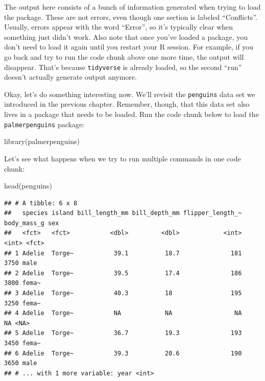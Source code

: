 \documentclass[
]{book}
\newenvironment{Shaded}{\begin{snugshade}}{\end{snugshade}}
\newcommand{\FunctionTok}[1]{\textcolor[rgb]{0.00,0.00,0.00}{#1}}
\newcommand{\NormalTok}[1]{#1}
\begin{document}
The output here consists of a bunch of information generated when trying to load the package. These are not errors, even though one section is labeled ``Conflicts''. Usually, errors appear with the word ``Error'', so it's typically clear when something just didn't work. Also note that once you've loaded a package, you don't need to load it again until you restart your R session. For example, if you go back and try to run the code chunk above one more time, the output will disappear. That's because \texttt{tidyverse} is already loaded, so the second ``run'' doesn't actually generate output anymore.

Okay, let's do something interesting now. We'll revisit the \texttt{penguins} data set we introduced in the previous chapter. Remember, though, that this data set also lives in a package that needs to be loaded. Run the code chunk below to load the \texttt{palmerpenguins} package:

\begin{Shaded}
\begin{Highlighting}[]
\FunctionTok{library}\NormalTok{(palmerpenguins)}
\end{Highlighting}
\end{Shaded}

Let's see what happens when we try to run multiple commands in one code chunk:

\begin{Shaded}
\begin{Highlighting}[]
\FunctionTok{head}\NormalTok{(penguins)}
\end{Highlighting}
\end{Shaded}

\begin{verbatim}
## # A tibble: 6 x 8
##   species island bill_length_mm bill_depth_mm flipper_length_~ body_mass_g sex  
##   <fct>   <fct>           <dbl>         <dbl>            <int>       <int> <fct>
## 1 Adelie  Torge~           39.1          18.7              181        3750 male 
## 2 Adelie  Torge~           39.5          17.4              186        3800 fema~
## 3 Adelie  Torge~           40.3          18                195        3250 fema~
## 4 Adelie  Torge~           NA            NA                 NA          NA <NA> 
## 5 Adelie  Torge~           36.7          19.3              193        3450 fema~
## 6 Adelie  Torge~           39.3          20.6              190        3650 male 
## # ... with 1 more variable: year <int>
\end{verbatim}
\end{document}
